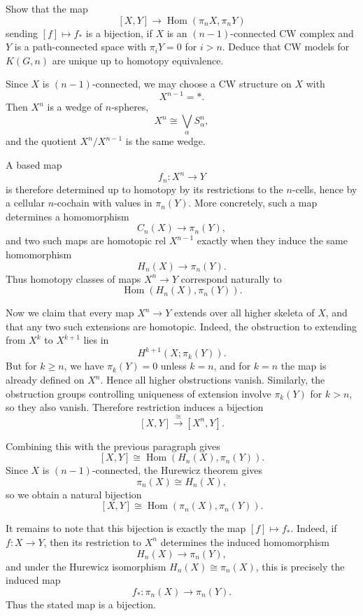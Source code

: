 \documentclass[12pt]{article}
\begin{document}
\begin{problem}[6 (Hatcher AT, 4.2.17)]
Show that the map
\[
[X,Y]\to \operatorname{Hom}(\pi_n X,\pi_n Y)
\]
sending \([f]\mapsto f_*\) is a bijection, if \(X\) is an \((n-1)\)-connected CW complex and \(Y\) is a path-connected space with \(\pi_i Y=0\) for \(i>n\). Deduce that CW models for \(K(G,n)\) are unique up to homotopy equivalence.
\end{problem}

\begin{solution}
Since \(X\) is \((n-1)\)-connected, we may choose a CW structure on \(X\) with
\[
X^{n-1}=*.
\]
Then \(X^n\) is a wedge of \(n\)-spheres,
\[
X^n \cong \bigvee_\alpha S^n_\alpha,
\]
and the quotient \(X^n/X^{n-1}\) is the same wedge.

A based map
\[
f_n:X^n\to Y
\]
is therefore determined up to homotopy by its restrictions to the \(n\)-cells, hence by a cellular \(n\)-cochain with values in \(\pi_n(Y)\). More concretely, such a map determines a homomorphism
\[
C_n(X)\to \pi_n(Y),
\]
and two such maps are homotopic rel \(X^{n-1}\) exactly when they induce the same homomorphism
\[
H_n(X)\to \pi_n(Y).
\]
Thus homotopy classes of maps \(X^n\to Y\) correspond naturally to
\[
\operatorname{Hom}(H_n(X),\pi_n(Y)).
\]

Now we claim that every map \(X^n\to Y\) extends over all higher skeleta of \(X\), and that any two such extensions are homotopic. Indeed, the obstruction to extending from \(X^k\) to \(X^{k+1}\) lies in
\[
H^{k+1}(X;\pi_k(Y)).
\]
But for \(k\ge n\), we have \(\pi_k(Y)=0\) unless \(k=n\), and for \(k=n\) the map is already defined on \(X^n\). Hence all higher obstructions vanish. Similarly, the obstruction groups controlling uniqueness of extension involve \(\pi_k(Y)\) for \(k>n\), so they also vanish. Therefore restriction induces a bijection
\[
[X,Y]\xrightarrow{\;\cong\;} [X^n,Y].
\]

Combining this with the previous paragraph gives
\[
[X,Y]\cong \operatorname{Hom}(H_n(X),\pi_n(Y)).
\]
Since \(X\) is \((n-1)\)-connected, the Hurewicz theorem gives
\[
\pi_n(X)\cong H_n(X),
\]
so we obtain a natural bijection
\[
[X,Y]\cong \operatorname{Hom}(\pi_n(X),\pi_n(Y)).
\]

It remains to note that this bijection is exactly the map \([f]\mapsto f_*\). Indeed, if \(f:X\to Y\), then its restriction to \(X^n\) determines the induced homomorphism
\[
H_n(X)\to \pi_n(Y),
\]
and under the Hurewicz isomorphism \(H_n(X)\cong \pi_n(X)\), this is precisely the induced map
\[
f_*:\pi_n(X)\to \pi_n(Y).
\]
Thus the stated map is a bijection.


\end{solution}
\end{document}
